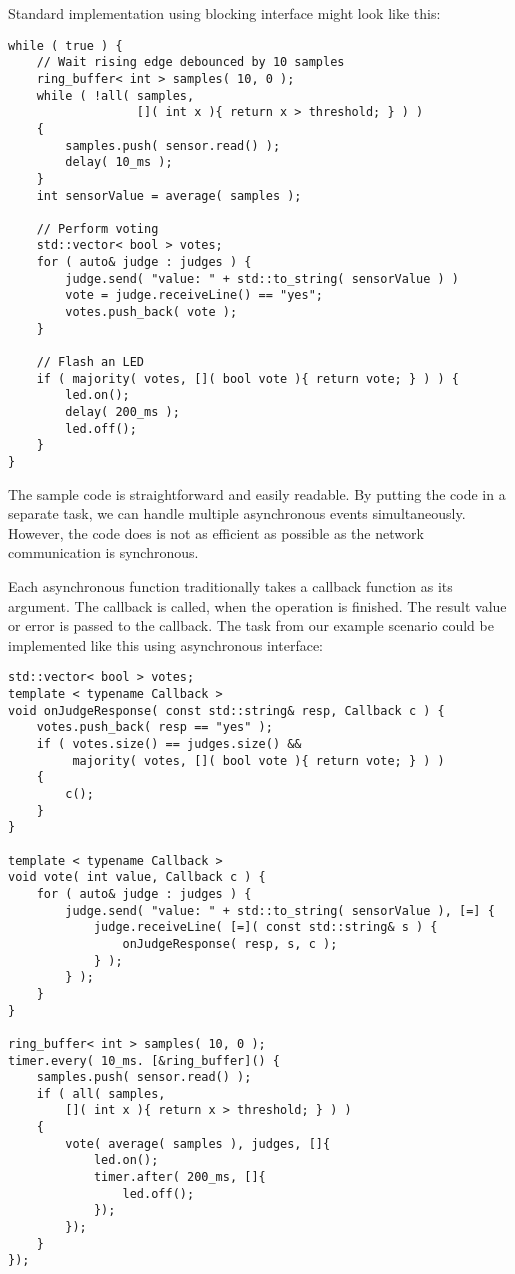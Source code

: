 Standard implementation using blocking interface might look like this:
\begin{verbatim}
while ( true ) {
    // Wait rising edge debounced by 10 samples
    ring_buffer< int > samples( 10, 0 );
    while ( !all( samples,
                  []( int x ){ return x > threshold; } ) )
    {
        samples.push( sensor.read() );
        delay( 10_ms );
    }
    int sensorValue = average( samples );

    // Perform voting
    std::vector< bool > votes;
    for ( auto& judge : judges ) {
        judge.send( "value: " + std::to_string( sensorValue ) )
        vote = judge.receiveLine() == "yes";
        votes.push_back( vote );
    }

    // Flash an LED
    if ( majority( votes, []( bool vote ){ return vote; } ) ) {
        led.on();
        delay( 200_ms );
        led.off();
    }
}
\end{verbatim}

The sample code is straightforward and easily readable. By putting the code in a
separate task, we can handle multiple asynchronous events simultaneously.
However, the code does is not as efficient as possible as the network
communication is synchronous.

Each asynchronous function traditionally takes a callback function as its
argument. The callback is called, when the operation is finished. The result
value or error is passed to the callback. The task from our example scenario
could be implemented like this using asynchronous interface:

\begin{verbatim}
std::vector< bool > votes;
template < typename Callback >
void onJudgeResponse( const std::string& resp, Callback c ) {
    votes.push_back( resp == "yes" );
    if ( votes.size() == judges.size() &&
         majority( votes, []( bool vote ){ return vote; } ) )
    {
        c();
    }
}

template < typename Callback >
void vote( int value, Callback c ) {
    for ( auto& judge : judges ) {
        judge.send( "value: " + std::to_string( sensorValue ), [=] {
            judge.receiveLine( [=]( const std::string& s ) {
                onJudgeResponse( resp, s, c );
            } );
        } );
    }
}

ring_buffer< int > samples( 10, 0 );
timer.every( 10_ms. [&ring_buffer]() {
    samples.push( sensor.read() );
    if ( all( samples,
        []( int x ){ return x > threshold; } ) )
    {
        vote( average( samples ), judges, []{
            led.on();
            timer.after( 200_ms, []{
                led.off();
            });
        });
    }
});
\end{verbatim}

